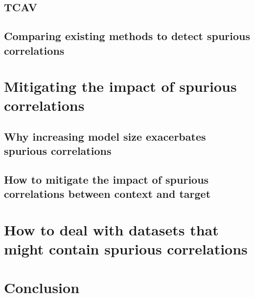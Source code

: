 \documentclass{article}
\begin{document}
\subsection{TCAV}
\subsection{Comparing existing methods to detect spurious correlations}

\section{Mitigating the impact of spurious correlations}
\subsection{Why increasing model size exacerbates spurious correlations}
\subsection{How to mitigate the impact of spurious correlations between context and target}

\section{How to deal with datasets that might contain spurious correlations}

\section{Conclusion}

\printbibliography
\end{document}
